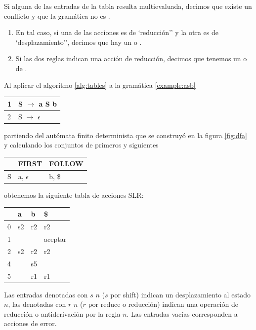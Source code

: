 \begin{definition}
Si alguna de las entradas de la tabla resulta multievaluada, decimos
que existe un conflicto y que la gramática no es .

\begin{enumerate}
\item
En tal caso, si una de las acciones es de `reducción'' y la otra es de
`desplazamiento'', decimos que hay un  o
. 
\item
Si las
dos reglas indican una acción de reducción, decimos que tenemos un 
 o de .
\end{enumerate}
\end{definition}

\begin{example}
\label{example:tablasslr}
Al aplicar el algoritmo \ref{alg:tables}       
a la gramática \ref{example:asb} 

\vspace{0.5cm}
\begin{center}
\begin{tabular}{|l|l|}
\hline
1 & S      $\rightarrow$  a S b\\
\hline
2 & S      $\rightarrow$ $\epsilon$ \\
\hline
\end{tabular}
\end{center}
\vspace{0.25cm}

partiendo del autómata finito determinista
que se construyó en 
la figura \ref{fig:dfa} y calculando los 
conjuntos de primeros y siguientes

\begin{center}
\begin{tabular}{|l|l|l|}
\hline
     & FIRST  & FOLLOW \\
\hline
S    & a, $\epsilon$ & b, \$\\
\hline
\end{tabular}
\end{center}

obtenemos la siguiente tabla de acciones SLR:

\begin{center}
\begin{tabular}{|l|l|l|l|}
\hline
     &  a  &  b  & \$ \\
\hline
0    & s2  &  r2 & r2 \\
\hline
1    &     &     & aceptar\\
\hline
2    & s2  & r2  & r2\\
\hline
4    &     & s5  &   \\
\hline
5    &     & r1  & r1\\
\hline
\end{tabular}
\end{center}

Las entradas denotadas con $s$ $n$ ($s$ por shift) indican un desplazamiento
al estado $n$, las denotadas con $r$ $n$ ($r$ por reduce o reducción) indican una operación
de reducción o antiderivación por la regla $n$.  Las entradas vacías 
corresponden a acciones de error.
\end{example}

